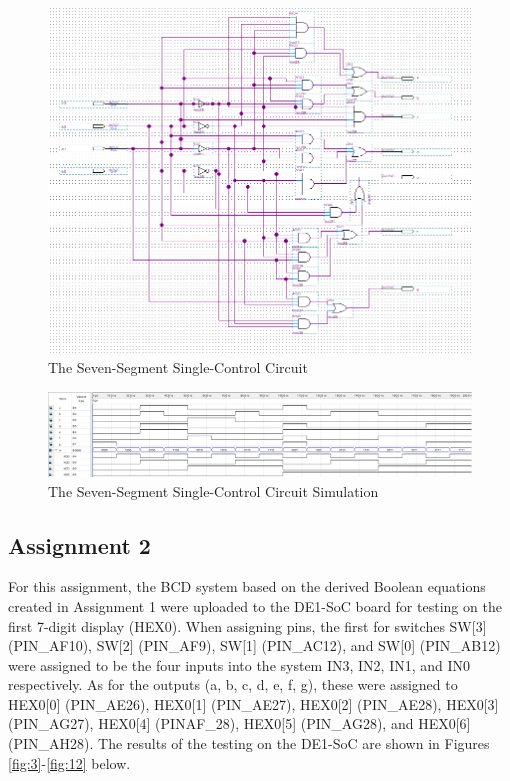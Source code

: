\documentclass[
	letterpaper, %
	10pt, %
]{CSUniSchoolLabReport}
\begin{document}
\begin{figure}[H]
  \centering
  \includegraphics[width=.9\textwidth]{Figures/Design.png}
  \caption{The Seven-Segment Single-Control Circuit}
  \label{fig:1}
\end{figure}

\begin{figure}[H]
  \centering
  \includegraphics[width=.9\textwidth]{Figures/Sim.png}
  \caption{The Seven-Segment Single-Control Circuit Simulation}
  \label{fig:2}
\end{figure}

\subsection{Assignment 2}

\hspace{.5 in} For this assignment, the BCD system based on the derived Boolean equations created in Assignment 1 were uploaded to the DE1-SoC board for testing on the first 7-digit display (HEX0). When  assigning pins, the first for switches SW[3] (PIN\_AF10), SW[2] (PIN\_AF9), SW[1] (PIN\_AC12), and SW[0] (PIN\_AB12) were assigned to be the four inputs into the system IN3, IN2, IN1, and IN0 respectively. As for the outputs (a, b, c, d, e, f, g), these were assigned to HEX0[0] (PIN\_AE26), HEX0[1] (PIN\_AE27), HEX0[2] (PIN\_AE28), HEX0[3] (PIN\_AG27),  HEX0[4] (PINAF\_28), HEX0[5] (PIN\_AG28), and HEX0[6] (PIN\_AH28). The results of the testing on the DE1-SoC are shown in Figures \ref{fig:3}-\ref{fig:12} below.
\end{document}

